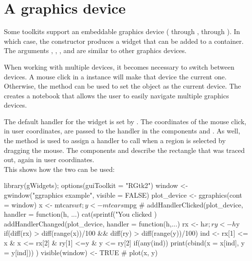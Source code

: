 \section{A graphics device}
\label{sec:gWidgets-graphics-device}

Some toolkits support an embeddable graphics device (
through ,  through ). In which case, the 
constructor produces a widget that can be added to a container. The
arguments , ,
, and  are similar to
other graphics devices.

When working with multiple devices, it becomes necessary to switch
between devices. A mouse click in a  instance will
make that device the current one. Otherwise, the
 method can be used to set the
object as the current device.  The 
creates a notebook that allows the user to easily navigate multiple
graphics devices.




The default handler for the widget is set by
. The coordinates of the mouse
click, in user coordinates, are passed to the handler in the
components  and . As well, the method
 is used to assign a handler to
call when a region is selected by dragging the mouse. The components
 and  describe the rectangle that was traced out,
again in user coordinates.
\\

This shows how the two can be used:
\begin{Schunk}
\begin{Sinput}
 library(gWidgets); options(guiToolkit = "RGtk2")
 window <- gwindow("ggraphics example", visible = FALSE)
 plot_device <- ggraphics(cont = window)
 x <- mtcars$wt; y <- mtcars$mpg
 #
 addHandlerClicked(plot_device, handler = function(h, ...) {
   cat(sprintf("You clicked %
 })
 addHandlerChanged(plot_device, handler = function(h,...) {
   rx <- h$x; ry <- h$y
   if(diff(rx) > diff(range(x))/100 && 
      diff(ry) > diff(range(y))/100) {
     ind <- rx[1] <= x & x <= rx[2] & ry[1] <=y & y <= ry[2]
     if(any(ind))
       print(cbind(x = x[ind], y = y[ind]))
   }
 })
 visible(window) <- TRUE
 #
 plot(x, y)
\end{Sinput}
\end{Schunk}
%

